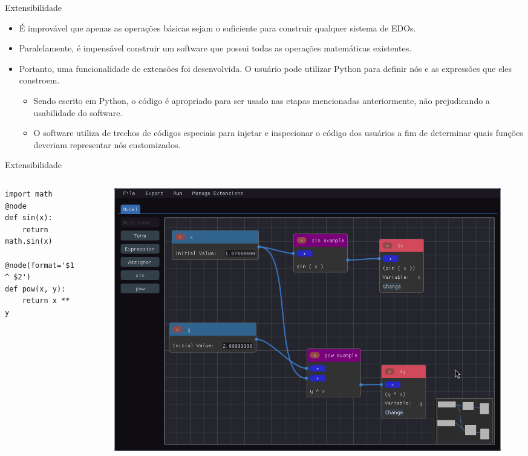 \begin{frame}[fragile]{Extensibilidade}
    \begin{itemize}
        \item É improvável que apenas as operações básicas sejam o suficiente para construir qualquer sistema de EDOs.
        \item Paralelamente, é impensável construir um software que possui todas as operações matemáticas existentes.
        \item Portanto, uma funcionalidade de extensões foi desenvolvida. O usuário pode utilizar Python para definir nós e as expressões que eles constroem.
        \begin{itemize}
            \item Sendo escrito em Python, o código é apropriado para ser usado nas etapas mencionadas anteriormente, não prejudicando a usabilidade do software.
            \item O software utiliza de trechos de códigos especiais para injetar e inspecionar o código dos usuários a fim de determinar quais funções deveriam representar nós customizados.
        \end{itemize}
    \end{itemize}
\end{frame}

\begin{frame}[fragile]{Extensibilidade}
    \begin{columns}
        \begin{column}{.3\textwidth}
            \begin{verbatim}
import math
@node
def sin(x):
    return math.sin(x)

@node(format='$1 ^ $2')
def pow(x, y):
    return x ** y
            \end{verbatim}
        \end{column}
        \begin{column}{.7\textwidth}
            \begin{figure}
                \centering
                \includegraphics[width=\textwidth]{contents/imgs/ode-designer/ext-sin-pow.png}
            \end{figure}
        \end{column}
    \end{columns}
\end{frame}

